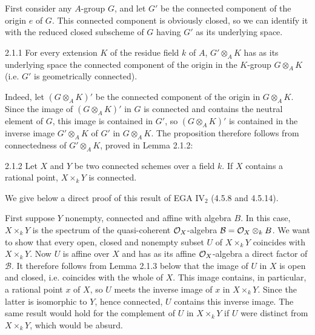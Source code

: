 First consider any $A$-group $G$, and let $G'$ be the connected component of the origin $e$ of $G$. This connected component is obviously closed, so we can identify it with the reduced closed subscheme of $G$ having $G'$ as its underlying space.
\begin{proposition}{2.1.1}\label{VIA.2.1.1}
For every extension $K$ of the residue field $k$ of $A$, $G'\otimes_AK$ has as its underlying space the connected component of the origin in the $K$-group $G\otimes_AK$ (i.e. $G'$ is geometrically connected).
\end{proposition}
Indeed, let $(G\otimes_AK)'$ be the connected component of the origin in $G\otimes_AK$. Since the image of $(G\otimes_AK)'$ in $G$ is connected and contains the neutral element of $G$, this image is contained in $G'$, so $(G\otimes_AK)'$ is contained in the inverse image $G'\otimes_AK$ of $G'$ in $G\otimes_AK$. The proposition therefore follows from connectedness of $G'\otimes_AK$, proved in Lemma 2.1.2:
\begin{lemma}{2.1.2}\label{VIA.2.1.2}
Let $X$ and $Y$ be two connected schemes over a field $k$. If $X$ contains a rational point, $X\times_kY$ is connected.
\end{lemma}
We give below a direct proof of this result of EGA IV$_2$ (4.5.8 and 4.5.14).

First suppose $Y$ nonempty, connected and affine with algebra $B$. In this case, $X\times_kY$ is the spectrum of the quasi-coherent $\mathcal{O}_X$-algebra $\mathcal B=\mathcal{O}_X\otimes_kB$. We want to show that every open, closed and nonempty subset $U$ of $X\times_kY$ coincides with $X\times_kY$. Now $U$ is affine over $X$ and has as its affine $\mathcal{O}_X$-algebra a direct factor of $\mathcal B$. It therefore follows from Lemma 2.1.3 below that the image of $U$ in $X$ is open and closed, i.e. coincides with the whole of $X$. This image contains, in particular, a rational point $x$ of $X$, so $U$ meets the inverse image of $x$ in $X\times_kY$. Since the latter is isomorphic to $Y$, hence connected, $U$ contains this inverse image. The same result would hold for the complement of $U$ in $X\times_kY$ if $U$ were distinct from $X\times_kY$, which would be absurd.

